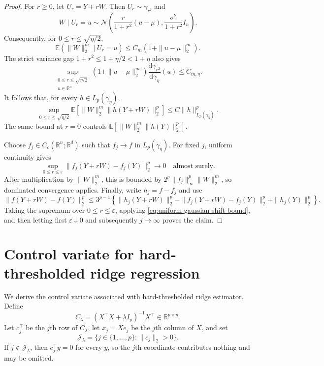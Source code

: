 \documentclass[12pt]{article}
\def\calN{\mathcal{N}}
\newcommand{\tran}{^\intercal}
\theoremstyle{general}
\begin{document}
\begin{proof}
For $r\geq0$, let $U_r=Y+rW$. Then
$U_r\sim\gamma_{r^2}$ and
\[
W\mid U_r=u\sim\calN\!\left(
\frac{r}{1+r^2}(u-\mu),
\frac{\sigma^2}{1+r^2}I_n
\right).
\]
Consequently, for $0\leq r\leq\sqrt{\eta/2}$,
\[
\mathbb E(\|W\|_2^m\mid U_r=u)
\leq C_m(1+\|u-\mu\|_2^m).
\]
The strict variance gap $1+r^2\leq1+\eta/2<1+\eta$ also gives
\[
\sup_{\substack{0\leq r\leq\sqrt{\eta/2}\\u\in\mathbb R^n}}
(1+\|u-\mu\|_2^m)
\frac{\mathrm d\gamma_{r^2}}{\mathrm d\gamma_\eta}(u)
\leq C_{m,\eta}.
\]
It follows that, for every $h\in L_p(\gamma_\eta)$,
\begin{equation}
\label{eq:uniform-gaussian-shift-bound}
\sup_{0\leq r\leq\sqrt{\eta/2}}
\mathbb E\!\left[
\|W\|_2^m\|h(Y+rW)\|_2^p
\right]
\leq C\|h\|_{L_p(\gamma_\eta)}^p.
\end{equation}
The same bound at $r=0$ controls
$\mathbb E[\|W\|_2^m\|h(Y)\|_2^p]$.

Choose $f_j\in C_c(\mathbb R^n;\mathbb R^d)$ such that
$f_j\to f$ in $L_p(\gamma_\eta)$. For fixed $j$, uniform continuity gives
\[
\sup_{0\leq r\leq\varepsilon}
\|f_j(Y+rW)-f_j(Y)\|_2^p\longrightarrow0
\quad\text{almost surely}.
\]
After multiplication by $\|W\|_2^m$, this is bounded by
$2^p\|f_j\|_\infty^p\|W\|_2^m$, so dominated convergence applies.
Finally, write $h_j=f-f_j$ and use
\[
\|f(Y+rW)-f(Y)\|_2^p
\leq 3^{p-1}\!\left
\{
\|h_j(Y+rW)\|_2^p
+\|f_j(Y+rW)-f_j(Y)\|_2^p
+\|h_j(Y)\|_2^p
\right\}.
\]
Taking the supremum over $0\leq r\leq\varepsilon$, applying
\eqref{eq:uniform-gaussian-shift-bound}, and then letting first
$\varepsilon\downarrow0$ and subsequently $j\to\infty$ proves the claim.
\end{proof}


\section{Control variate for hard-thresholded ridge regression}
\label{app:hard-thresholded-ridge-control-variate}

We derive the control variate associated with
hard-thresholded ridge estimator. Define
\begin{equation*}
C_{\lambda}
=
(X\tran X+\lambda I_p)^{-1}X\tran
\in\mathbb R^{p\times n}.
\end{equation*}
Let \(c_j\tran\) be the \(j\)th row of \(C_{\lambda}\), let
\(x_j=Xe_j\) be the \(j\)th column of \(X\), and set
\[
\mathcal J_{\lambda}
=
\{j\in\{1,\ldots,p\}:\|c_j\|_2>0\}.
\]
If \(j\notin\mathcal J_{\lambda}\), then \(c_j\tran y=0\) for every
\(y\), so the \(j\)th coordinate contributes nothing and may be
omitted.
\end{document}
